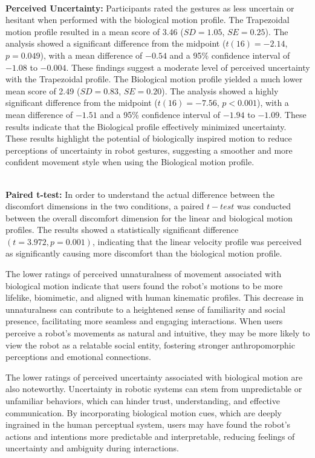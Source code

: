 \documentclass{CSSRforAfrica}
\begin{document}
~\\
\noindent \textbf{Perceived Uncertainty:}
Participants rated the gestures as less uncertain or hesitant when performed with the biological motion profile. 
The Trapezoidal motion profile resulted in a mean score of 3.46 ($SD = 1.05$, $SE = 0.25$). The analysis showed a significant difference from the midpoint ($t(16) = -2.14$, $p = 0.049$), with a mean difference of $-0.54$ and a 95\% confidence interval of $-1.08$ to $-0.004$. These findings suggest a moderate level of perceived uncertainty with the Trapezoidal profile.
The Biological motion profile yielded a much lower mean score of 2.49 ($SD = 0.83$, $SE = 0.20$). The analysis showed a highly significant difference from the midpoint ($t(16) = -7.56$, $p < 0.001$), with a mean difference of $-1.51$ and a 95\% confidence interval of $-1.94$ to $-1.09$. These results indicate that the Biological profile effectively minimized uncertainty.
These results highlight the potential of biologically inspired motion to reduce perceptions of uncertainty in robot gestures, suggesting a smoother and more confident movement style when using the Biological motion profile.

~\\
\noindent \textbf{Paired t-test:}
In order to understand the actual difference between the discomfort dimensions in the two conditions, a paired $t-test$ was conducted between the overall discomfort dimension for the linear and biological motion profiles. The results showed a statistically significant difference $(t = 3.972, p  = 0.001)$, indicating that the linear velocity profile was perceived as significantly causing more discomfort than the biological motion profile.

The lower ratings of perceived unnaturalness of movement associated with biological motion indicate that users found the robot's motions to be more lifelike, biomimetic, and aligned with human kinematic profiles. This decrease in unnaturalness can contribute to a heightened sense of familiarity and social presence, facilitating more seamless and engaging interactions. When users perceive a robot's movements as natural and intuitive, they may be more likely to view the robot as a relatable social entity, fostering stronger anthropomorphic perceptions and emotional connections.

The lower ratings of perceived uncertainty associated with biological motion are also noteworthy. Uncertainty in robotic systems can stem from unpredictable or unfamiliar behaviors, which can hinder trust, understanding, and effective communication. By incorporating biological motion cues, which are deeply ingrained in the human perceptual system, \cite{SimionRegolinBulf08} users may have found the robot's actions and intentions more predictable and interpretable, reducing feelings of uncertainty and ambiguity during interactions.
\end{document}
